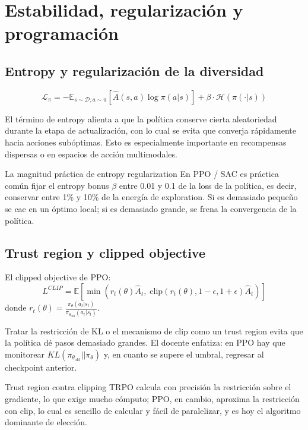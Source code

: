 \section{Estabilidad, regularización y programación}

\subsection{Entropy y regularización de la diversidad}

\begin{equation*}
\mathcal{L}_\pi = -\mathbb{E}_{s \sim \mathcal{D}, a \sim \pi} \left[\hat{A}(s,a)\log \pi(a|s)\right] + \beta \cdot \mathcal{H}(\pi(\cdot|s))
\end{equation*}

El término de entropy alienta a que la política conserve cierta aleatoriedad durante la etapa de actualización, con lo cual se evita que converja rápidamente hacia acciones subóptimas. Esto es especialmente importante en recompensas dispersas o en espacios de acción multimodales.

\begin{importantbox}{La magnitud práctica de entropy regularization}
En PPO / SAC es práctica común fijar el entropy bonus $\beta$ entre 0.01 y 0.1 de la loss de la política, es decir, conservar entre 1\% y 10\% de la energía de exploration. Si es demasiado pequeño se cae en un óptimo local; si es demasiado grande, se frena la convergencia de la política.
\end{importantbox}

\subsection{Trust region y clipped objective}

El clipped objective de PPO:
$${L}^{CLIP} = \mathbb{E} \left[ \min\left( r_t(\theta)\hat{A}_t, \; \text{clip}(r_t(\theta), 1-\epsilon, 1+\epsilon)\hat{A}_t \right) \right]$$
donde $r_t(\theta) = \frac{\pi_\theta(a_t|s_t)}{\pi_{\theta_{\text{old}}}(a_t|s_t)}$.

Tratar la restricción de KL o el mecanismo de clip como un trust region evita que la política dé pasos demasiado grandes. El docente enfatiza: en PPO hay que monitorear $KL(\pi_{\theta_{\text{old}}}||\pi_\theta)$ y, en cuanto se supere el umbral, regresar al checkpoint anterior.

\begin{knowledgebox}{Trust region contra clipping}
TRPO calcula con precisión la restricción sobre el gradiente, lo que exige mucho cómputo; PPO, en cambio, aproxima la restricción con clip, lo cual es sencillo de calcular y fácil de paralelizar, y es hoy el algoritmo dominante de elección.
\end{knowledgebox}

